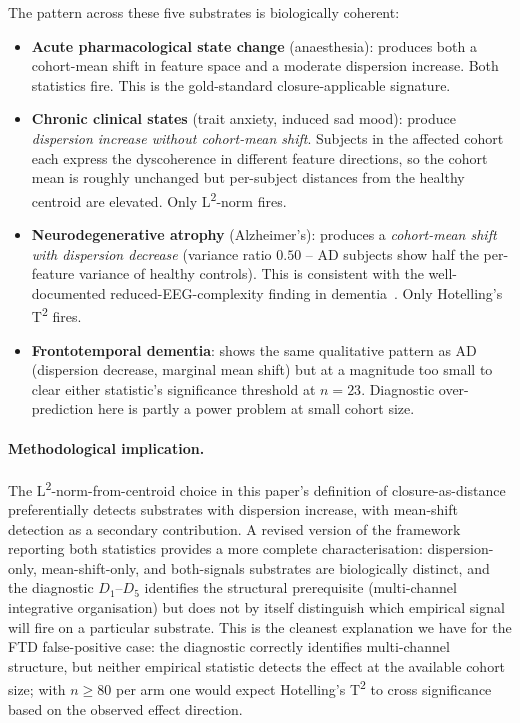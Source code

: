 \documentclass[11pt,a4paper]{article}
\begin{document}
The pattern across these five substrates is biologically coherent:
\begin{itemize}\itemsep0pt
\item \textbf{Acute pharmacological state change} (anaesthesia): produces both a cohort-mean shift in feature space and a moderate dispersion increase. Both statistics fire. This is the gold-standard closure-applicable signature.
\item \textbf{Chronic clinical states} (trait anxiety, induced sad mood): produce \emph{dispersion increase without cohort-mean shift}. Subjects in the affected cohort each express the dyscoherence in different feature directions, so the cohort mean is roughly unchanged but per-subject distances from the healthy centroid are elevated. Only L\textsuperscript{2}-norm fires.
\item \textbf{Neurodegenerative atrophy} (Alzheimer's): produces a \emph{cohort-mean shift with dispersion decrease} (variance ratio $0.50$ -- AD subjects show half the per-feature variance of healthy controls). This is consistent with the well-documented reduced-EEG-complexity finding in dementia~\citep{MiltiadousDementia2023}. Only Hotelling's T\textsuperscript{2} fires.
\item \textbf{Frontotemporal dementia}: shows the same qualitative pattern as AD (dispersion decrease, marginal mean shift) but at a magnitude too small to clear either statistic's significance threshold at $n=23$. Diagnostic over-prediction here is partly a power problem at small cohort size.
\end{itemize}

\paragraph{Methodological implication.} The L\textsuperscript{2}-norm-from-centroid choice in this paper's definition of closure-as-distance preferentially detects substrates with dispersion increase, with mean-shift detection as a secondary contribution. A revised version of the framework reporting both statistics provides a more complete characterisation: dispersion-only, mean-shift-only, and both-signals substrates are biologically distinct, and the diagnostic $D_1$--$D_5$ identifies the structural prerequisite (multi-channel integrative organisation) but does not by itself distinguish which empirical signal will fire on a particular substrate. This is the cleanest explanation we have for the FTD false-positive case: the diagnostic correctly identifies multi-channel structure, but neither empirical statistic detects the effect at the available cohort size; with $n \geq 80$ per arm one would expect Hotelling's T\textsuperscript{2} to cross significance based on the observed effect direction.
\end{document}
